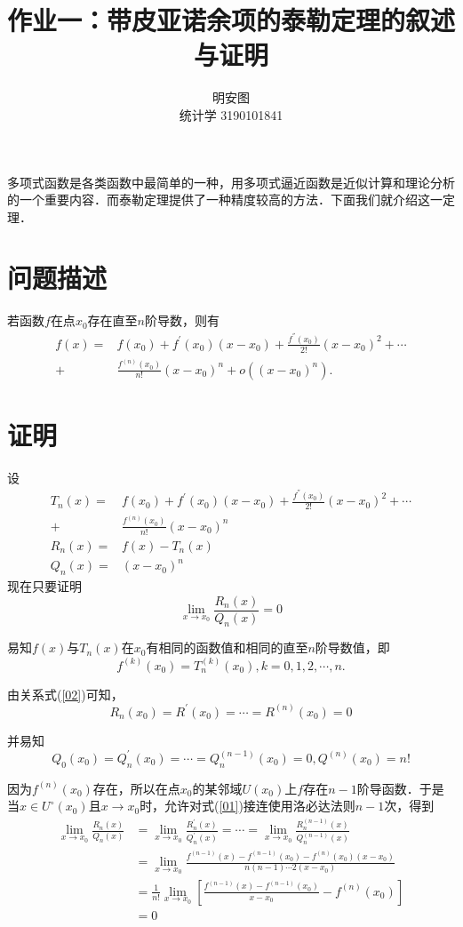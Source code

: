 \documentclass{ctexart}
\title{作业一：带皮亚诺余项的泰勒定理的叙述与证明}
\author{明安图 \\ 统计学 3190101841}
\begin{document}
\maketitle

多项式函数是各类函数中最简单的一种，用多项式逼近函数是近似计算和理论分析的一个重要内容．而泰勒定理提供了一种精度较高的方法．下面我们就介绍这一定理．
\section{问题描述}
若函数$f$在点$x_0$存在直至$n$阶导数，则有
$$
\begin{aligned}
  f(x)=&f(x_0)+f^{'}(x_0)(x-x_0)+\frac{f^{''}(x_0)}{2!}(x-x_0)^2+\cdots \\
  +&\frac{f^{(n)}(x_0)}{n!}(x-x_0)^n+o((x-x_0)^n).
\end{aligned}
$$

\section{证明}

设
$$
\begin{aligned}
  T_n(x)=&f(x_0)+f^{'}(x_0)(x-x_0)+\frac{f^{''}(x_0)}{2!}(x-x_0)^2+\cdots \\
  +&\frac{f^{(n)}(x_0)}{n!}(x-x_0)^n \\
  R_n(x)=&f(x)-T_n(x) \\
  Q_n(x)=&(x-x_0)^n
\end{aligned}
$$
现在只要证明
\begin{equation}
  \lim_{x \rightarrow x_{0}}\frac{R_n(x)}{Q_n(x)}=0
  \label{01}
\end{equation}

易知$f(x)$与$T_n(x)$在$x_0$有相同的函数值和相同的直至$n$阶导数值，即
\begin{equation}
  f^{(k)}(x_0)=T^{(k)}_n(x_0),k=0,1,2,\cdots,n.
  \label{02}
\end{equation}

由关系式(\ref{02})可知，
\begin{equation}
  R_n(x_0)=R^{'}(x_0)=\cdots=R^{(n)}(x_0)=0
\end{equation}

并易知
\begin{equation}
  Q_0(x_0)=Q^{'}_n(x_0)=\cdots=Q^{(n-1)}_n(x_0)=0,Q^{(n)}(x_0)=n!
\end{equation}

因为$f^{(n)}(x_0)$存在，所以在点$x_0$的某邻域$U(x_0)$上$f$存在$n-1$阶导函数．于是当$x \in U^{\circ}(x_0)$且$x \rightarrow x_0$时，允许对式(\ref{01})接连使用洛必达法则$n-1$次，得到
$$
\begin{aligned}
  \lim_{x \rightarrow x_{0}}\frac{R_n(x)}{Q_n(x)}&=\lim_{x \rightarrow x_{0}}\frac{R^{'}_n(x)}{Q^{'}_n(x)}=\cdots=\lim_{x \rightarrow x_{0}}\frac{R^{(n-1)}_n(x)}{Q^{(n-1)}_n(x)} \\
  &=\lim_{x \rightarrow x_{0}}\frac{f^{(n-1)}(x)-f^{(n-1)}(x_0)-f^{(n)}(x_0)(x-x_0)}{n(n-1)\cdots2(x-x_0)} \\
  &=\frac{1}{n!}\lim_{x \rightarrow x_{0}}\left[\frac{f^{(n-1)}(x)-f^{(n-1)}(x_0)}{x-x_0}-f^{(n)}(x_0)\right] \\
  &=0
\end{aligned}
$$
\end{document}
